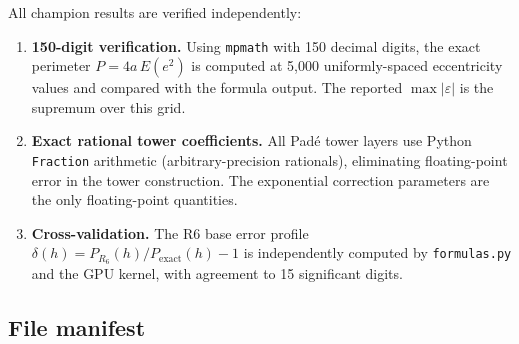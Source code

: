 \documentclass[12pt]{article}
\begin{document}
All champion results are verified independently:
\begin{enumerate}
\item \textbf{150-digit verification.} Using \texttt{mpmath} with 150 decimal digits, the exact perimeter $P = 4a\,E(e^2)$ is computed at 5{,}000 uniformly-spaced eccentricity values and compared with the formula output. The reported $\max|\varepsilon|$ is the supremum over this grid.
\item \textbf{Exact rational tower coefficients.} All Pad\'e tower layers use Python \texttt{Fraction} arithmetic (arbitrary-precision rationals), eliminating floating-point error in the tower construction. The exponential correction parameters are the only floating-point quantities.
\item \textbf{Cross-validation.} The R6 base error profile $\delta(h) = P_{R_6}(h)/P_{\text{exact}}(h) - 1$ is independently computed by \texttt{formulas.py} and the GPU kernel, with agreement to 15 significant digits.
\end{enumerate}

\subsection{File manifest}
\end{document}
